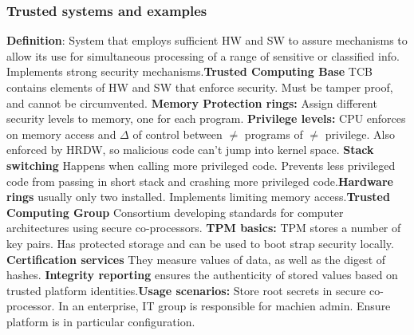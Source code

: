 \documentclass[a4paper,1pt]{article}
\begin{document}
\subsubsection{Trusted systems and examples}
{\bf Definition}: System that employs sufficient HW and SW to assure mechanisms to allow its use for simultaneous processing of a range of sensitive or classified info. Implements strong security mechanisms.{\bf Trusted Computing Base} TCB contains elements of HW and SW that enforce security. Must be tamper proof, and cannot be circumvented. {\bf Memory Protection rings:} Assign different security levels to memory, one for each program. {\bf Privilege levels:} CPU enforces on memory access and $\Delta$ of control between $\neq$ programs of $\neq$ privilege. Also enforced by HRDW, so malicious code can't jump into kernel space. {\bf Stack switching} Happens when calling more privileged code. Prevents less privileged code from passing in short stack and crashing more privileged code.{\bf Hardware rings} usually only two installed. Implements limiting memory access.{\bf Trusted Computing Group} Consortium developing standards for computer architectures using secure co-processors. {\bf TPM basics:} TPM stores a number  of key pairs. Has protected storage and can be used to boot strap security locally. {\bf Certification services} They measure values of data, as well as the digest of hashes. {\bf Integrity reporting} ensures the authenticity of stored values based on trusted platform identities.{\bf Usage scenarios:} Store root secrets in secure co-processor. In an enterprise, IT group is responsible for machien admin. Ensure platform is in particular configuration.
\end{document}
